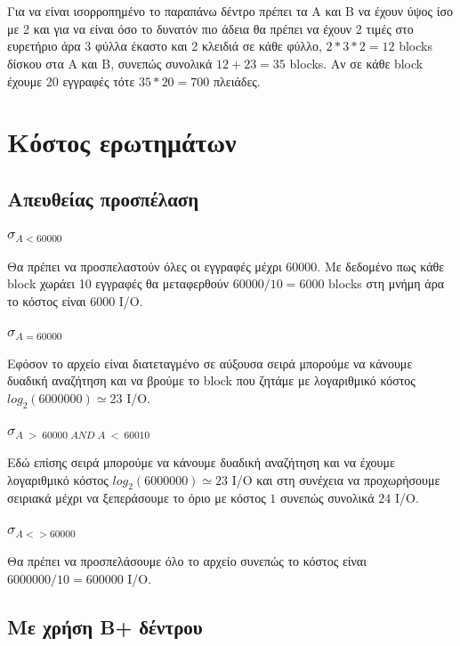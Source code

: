 \documentclass[a4paper,10pt]{article}
\begin{document}
\section{}
Για να είναι ισορροπημένο το παραπάνω δέντρο πρέπει τα Α και Β να έχουν ύψος
ίσο με 2 και για να είναι όσο το δυνατόν πιο άδεια θα πρέπει να έχουν
2 τιμές στο ευρετήριο άρα 3 φύλλα έκαστο και 2 κλειδιά σε κάθε φύλλο,
$2*3*2=12$ blocks δίσκου στα Α και Β, συνεπώς συνολικά $12+23=35$ blocks. Αν
σε κάθε block έχουμε 20 εγγραφές τότε $35*20=700$ πλειάδες.
\section{Κόστος ερωτημάτων}
\subsection{Απευθείας προσπέλαση}
\subsubsection{$\sigma_{A < 60000}$}
Θα πρέπει να προσπελαστούν όλες οι εγγραφές μέχρι 60000. Με δεδομένο πως κάθε
block χωράει 10 εγγραφές θα μεταφερθούν $60000/10=6000$ blocks στη μνήμη άρα
το κόστος είναι 6000 I/O.
\subsubsection{$\sigma_{A = 60000}$}
Εφόσον το αρχείο είναι διατεταγμένο σε αύξουσα σειρά μπορούμε να κάνουμε
δυαδική αναζήτηση και να βρούμε το block που ζητάμε με λογαριθμικό κόστος
$log_2{(6000000)} \simeq 23$ I/O.
\subsubsection{$\sigma_{A\; >\; 60000\; AND\; A\; <\; 60010}$}
Εδώ επίσης σειρά μπορούμε να κάνουμε δυαδική αναζήτηση και να έχουμε
λογαριθμικό κόστος $log_2{(6000000)} \simeq 23$ I/O και στη συνέχεια να
προχωρήσουμε σειριακά μέχρι να ξεπεράσουμε το όριο με κόστος $1$ συνεπώς
συνολικά $24$ I/O.
\subsubsection{$\sigma_{A <> 60000}$}
Θα πρέπει να προσπελάσουμε όλο το αρχείο συνεπώς το κόστος είναι
$6000000/10=600000$ I/O.
\subsection{Με χρήση B+ δέντρου}
\end{document}
